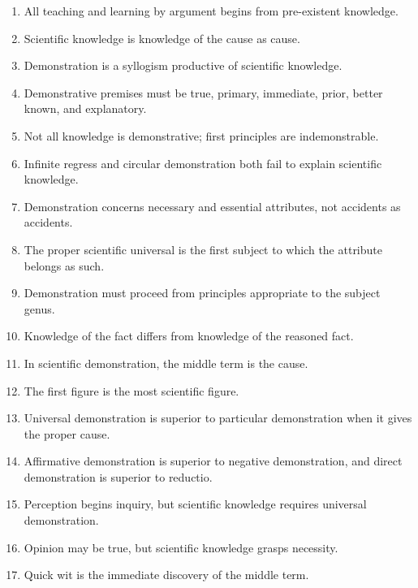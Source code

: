 \documentclass[12pt]{article}
\begin{document}
\begin{enumerate}[itemsep=0.5em]
    \item All teaching and learning by argument begins from pre-existent
    knowledge.

    \item Scientific knowledge is knowledge of the cause as cause.

    \item Demonstration is a syllogism productive of scientific knowledge.

    \item Demonstrative premises must be true, primary, immediate, prior,
    better known, and explanatory.

    \item Not all knowledge is demonstrative; first principles are
    indemonstrable.

    \item Infinite regress and circular demonstration both fail to explain
    scientific knowledge.

    \item Demonstration concerns necessary and essential attributes, not
    accidents as accidents.

    \item The proper scientific universal is the first subject to which the
    attribute belongs as such.

    \item Demonstration must proceed from principles appropriate to the subject
    genus.

    \item Knowledge of the fact differs from knowledge of the reasoned fact.

    \item In scientific demonstration, the middle term is the cause.

    \item The first figure is the most scientific figure.

    \item Universal demonstration is superior to particular demonstration when
    it gives the proper cause.

    \item Affirmative demonstration is superior to negative demonstration, and
    direct demonstration is superior to reductio.

    \item Perception begins inquiry, but scientific knowledge requires
    universal demonstration.

    \item Opinion may be true, but scientific knowledge grasps necessity.

    \item Quick wit is the immediate discovery of the middle term.
\end{enumerate}
\end{document}
